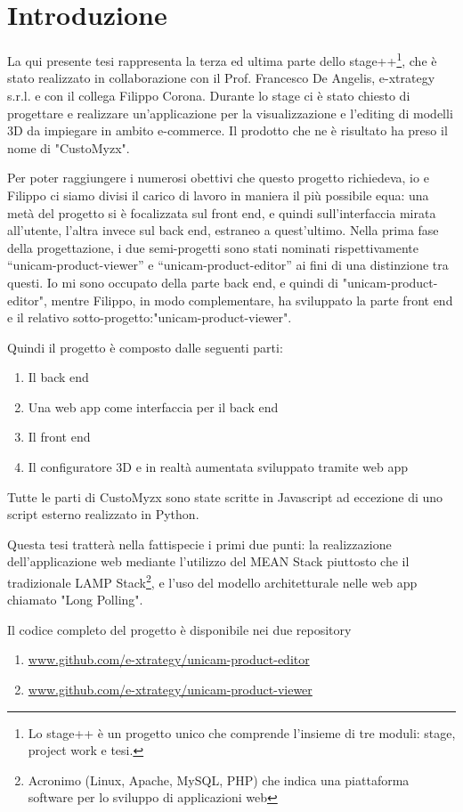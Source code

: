 \chapter{Introduzione}
\label{chap:intro}
La qui presente tesi rappresenta la terza ed ultima parte dello stage++\footnote{Lo stage++ è un progetto unico che comprende l'insieme di tre moduli: stage, project work e tesi.}, che è stato realizzato in collaborazione con il Prof. Francesco De Angelis, e-xtrategy s.r.l. e con il collega Filippo Corona.
Durante lo stage ci è stato chiesto di progettare e realizzare un’applicazione per la visualizzazione e l'editing di modelli
3D da impiegare in ambito e-commerce.
Il prodotto che ne è risultato ha preso il nome di "CustoMyzx".

Per poter raggiungere i numerosi obettivi che questo progetto richiedeva, io e Filippo ci siamo divisi il carico di lavoro in maniera il più possibile equa: una metà del progetto si è focalizzata sul front end, e quindi sull’interfaccia mirata all’utente, l’altra invece sul back end, estraneo a quest’ultimo.
Nella prima fase della progettazione, i due semi-progetti sono stati nominati rispettivamente “unicam-product-viewer” e “unicam-product-editor” ai fini di una distinzione tra questi.
Io mi sono occupato della parte back end, e quindi di "unicam-product-editor", mentre Filippo, in modo complementare, ha sviluppato la parte front end e il relativo sotto-progetto:"unicam-product-viewer".

Quindi il progetto è composto dalle seguenti parti:
\begin{enumerate}
	\item Il back end
	\item Una web app come interfaccia per il back end
	\item Il front end
	\item Il configuratore 3D e in realtà aumentata sviluppato tramite web app
\end{enumerate}
Tutte le parti di CustoMyzx sono state scritte in Javascript ad eccezione di uno script esterno realizzato in Python.

Questa tesi tratterà nella fattispecie i primi due punti: la realizzazione dell'applicazione web mediante l'utilizzo del MEAN Stack piuttosto che il tradizionale LAMP Stack\footnote{Acronimo (Linux, Apache, MySQL, PHP) che indica una piattaforma software per lo sviluppo di applicazioni web}, e l'uso del modello architetturale nelle web app chiamato "Long Polling".

Il codice completo del progetto è disponibile nei due repository
\begin{enumerate}
	\item \url{www.github.com/e-xtrategy/unicam-product-editor}
	\item \url{www.github.com/e-xtrategy/unicam-product-viewer}
\end{enumerate} 

